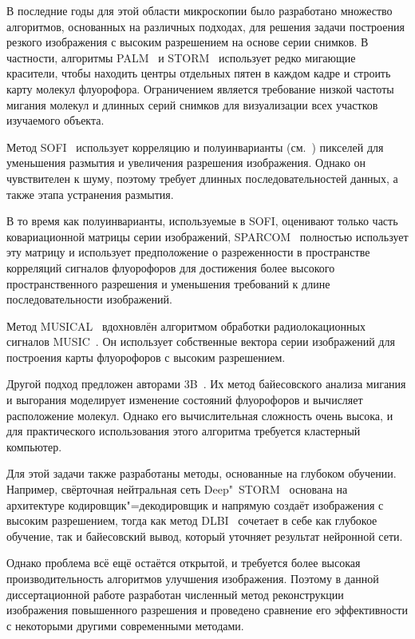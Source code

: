 В последние годы для этой области микроскопии было разработано множество алгоритмов, основанных на различных подходах, для решения задачи построения резкого изображения с высоким разрешением на основе серии снимков. В частности, алгоритмы PALM~\cite{betzig2006imaging} и STORM~\cite{rust2006sub} использует редко мигающие красители, чтобы находить центры отдельных пятен в каждом кадре и строить карту молекул флуорофора. Ограничением является требование низкой частоты мигания молекул и длинных серий снимков для визуализации всех участков изучаемого объекта.

Метод SOFI~\cite{dertinger2009fast, dertinger2010achieving} использует корреляцию и полуинварианты (см.~\cite{75086, малахов1978кумулянтный}) пикселей для уменьшения размытия и увеличения разрешения изображения. Однако он чувствителен к шуму, поэтому требует длинных последовательностей данных, а также этапа устранения размытия.

В то время как полуинварианты, используемые в SOFI, оценивают только часть ковариационной матрицы серии изображений, SPARCOM~\cite{Solomon:18} полностью использует эту матрицу и использует предположение о разреженности в пространстве корреляций сигналов флуорофоров для достижения более высокого пространственного разрешения и уменьшения требований к длине последовательности изображений.

Метод MUSICAL~\cite{agarwal2016multiple} вдохновлён алгоритмом обработки радиолокационных сигналов MUSIC~\cite{schmidt1986multiple}. Он использует собственные вектора серии изображений для построения карты флуорофоров с высоким разрешением.

Другой подход предложен авторами 3B~\cite{cox2012bayesian}. Их метод байесовского анализа мигания и выгорания моделирует изменение состояний флуорофоров и вычисляет расположение молекул. Однако его вычислительная сложность очень высока, и для практического использования этого алгоритма требуется кластерный компьютер.

Для этой задачи также разработаны методы, основанные на глубоком обучении. Например, свёрточная нейтральная сеть Deep"~STORM~\cite{Nehme:18} основана на архитектуре кодировщик"=декодировщик и напрямую создаёт изображения с высоким разрешением, тогда как метод DLBI~\cite{10.1093/bioinformatics/bty241} сочетает в себе как глубокое обучение, так и байесовский вывод, который уточняет результат нейронной сети.

Однако проблема всё ещё остаётся открытой, и требуется более высокая производительность алгоритмов улучшения изображения. Поэтому в данной диссертационной работе разработан численный метод реконструкции изображения повышенного разрешения и проведено сравнение его эффективности с некоторыми другими современными методами.

